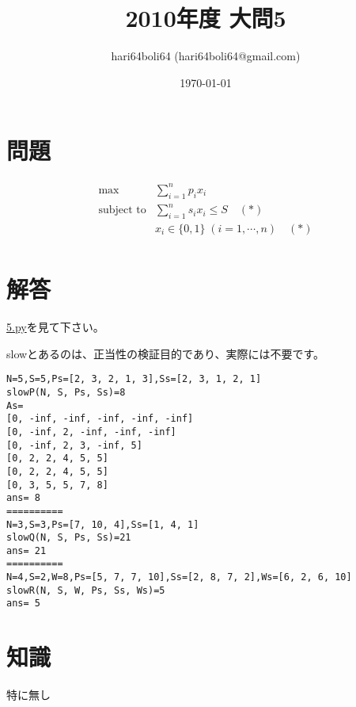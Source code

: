 \documentclass[a4paper, 10pt, dvipdfmx]{jlreq}
\begin{document}
\title{2010年度 大問5}
\author{hari64boli64 (hari64boli64@gmail.com)}
\date{\today}
\maketitle

\section{問題}

\begin{align*}
  \max              & \sum_{i=1}^{n} p_i x_i                      \\
  \text{subject to} & \sum_{i=1}^{n} s_i x_i \leq S \quad (*)     \\
                    & x_i \in \{0,1\} \; (i=1,\cdots,n) \quad (*) \\
\end{align*}

\section{解答}

\href{./5.py}{5.py}を見て下さい。

slowとあるのは、正当性の検証目的であり、実際には不要です。



\begin{lstlisting}[caption=output, label=code:output]
N=5,S=5,Ps=[2, 3, 2, 1, 3],Ss=[2, 3, 1, 2, 1]
slowP(N, S, Ps, Ss)=8
As=
[0, -inf, -inf, -inf, -inf, -inf]
[0, -inf, 2, -inf, -inf, -inf]
[0, -inf, 2, 3, -inf, 5]
[0, 2, 2, 4, 5, 5]
[0, 2, 2, 4, 5, 5]
[0, 3, 5, 5, 7, 8]
ans= 8
==========
N=3,S=3,Ps=[7, 10, 4],Ss=[1, 4, 1]
slowQ(N, S, Ps, Ss)=21
ans= 21
==========
N=4,S=2,W=8,Ps=[5, 7, 7, 10],Ss=[2, 8, 7, 2],Ws=[6, 2, 6, 10]
slowR(N, S, W, Ps, Ss, Ws)=5
ans= 5
\end{lstlisting}

\section{知識}

特に無し
\end{document}
